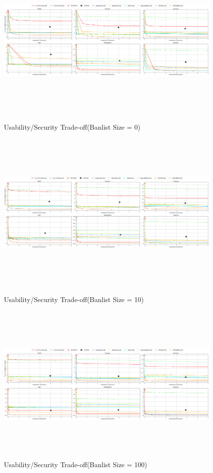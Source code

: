 \begin{figure}
	\includegraphics[width=\linewidth, height = 8cm]{Figures/Experiments/B0.png}
	\vspace{-0.2in}
	\caption[Usability/Security Trade-off]{Usability/Security Trade-off(Banlist Size = 0)}
	\label{fig:secuseB0}
	\includegraphics[width=\linewidth, height = 8cm]{Figures/Experiments/B10.png}
	\vspace{-0.2in}
	\caption[Usability/Security Trade-off]{Usability/Security Trade-off(Banlist Size = 10)}
	\label{fig:secuseB10}
	\includegraphics[width=\linewidth, height = 8cm]{Figures/Experiments/B100.png}
	\vspace{-0.2in}
	\caption[Usability/Security Trade-off]{Usability/Security Trade-off(Banlist Size = 100)}
	\label{fig:secuseB100}
\end{figure}

